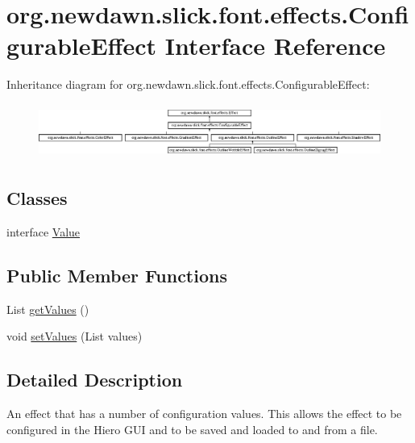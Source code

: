 \hypertarget{interfaceorg_1_1newdawn_1_1slick_1_1font_1_1effects_1_1_configurable_effect}{}\section{org.\+newdawn.\+slick.\+font.\+effects.\+Configurable\+Effect Interface Reference}
\label{interfaceorg_1_1newdawn_1_1slick_1_1font_1_1effects_1_1_configurable_effect}
Inheritance diagram for org.\+newdawn.\+slick.\+font.\+effects.\+Configurable\+Effect\+:\begin{figure}[H]
\begin{center}
\leavevmode
\includegraphics[height=1.800643cm]{interfaceorg_1_1newdawn_1_1slick_1_1font_1_1effects_1_1_configurable_effect}
\end{center}
\end{figure}
\subsection*{Classes}
\begin{DoxyCompactItemize}
\item 
interface \mbox{\hyperlink{interfaceorg_1_1newdawn_1_1slick_1_1font_1_1effects_1_1_configurable_effect_1_1_value}{Value}}
\end{DoxyCompactItemize}
\subsection*{Public Member Functions}
\begin{DoxyCompactItemize}
\item 
List \mbox{\hyperlink{interfaceorg_1_1newdawn_1_1slick_1_1font_1_1effects_1_1_configurable_effect_ac4ea8fedf0f9d7ca7ffe1bd5543d78cb}{get\+Values}} ()
\item 
void \mbox{\hyperlink{interfaceorg_1_1newdawn_1_1slick_1_1font_1_1effects_1_1_configurable_effect_ac5e1cb43cb0c6b61753616dc746903a2}{set\+Values}} (List values)
\end{DoxyCompactItemize}


\subsection{Detailed Description}
An effect that has a number of configuration values. This allows the effect to be configured in the Hiero G\+UI and to be saved and loaded to and from a file.

